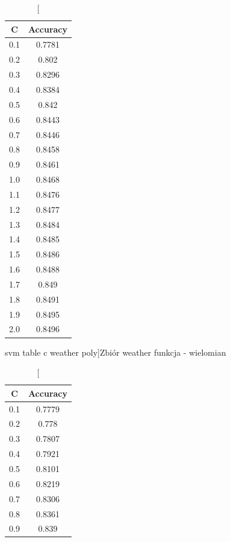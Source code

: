 \documentclass{classrep}
\begin{document}
{{%
\begin{table}[!htbp]
    \begin{minipage}{.35\textwidth}
        \centering
        \begin{tabular}{|c|c|}
            \hline
			C & Accuracy \\ \hline
0.1 & 0.7781 \\ \hline
0.2 & 0.802 \\ \hline
0.3 & 0.8296 \\ \hline
0.4 & 0.8384 \\ \hline
0.5 & 0.842 \\ \hline
0.6 & 0.8443 \\ \hline
0.7 & 0.8446 \\ \hline
0.8 & 0.8458 \\ \hline
0.9 & 0.8461 \\ \hline
1.0 & 0.8468 \\ \hline
1.1 & 0.8476 \\ \hline
1.2 & 0.8477 \\ \hline
1.3 & 0.8484 \\ \hline
1.4 & 0.8485 \\ \hline
1.5 & 0.8486 \\ \hline
1.6 & 0.8488 \\ \hline
1.7 & 0.849 \\ \hline
1.8 & 0.8491 \\ \hline
1.9 & 0.8495 \\ \hline
2.0 & 0.8496 \\ \hline
        \end{tabular}
        \caption
        [svm table c weather poly]{Zbiór weather funkcja - wielomian}
		\label{svm_table_c_weather_poly}
    \end{minipage}
    \hfill
    \begin{minipage}{.3\textwidth}
        \centering
        \begin{tabular}{|c|c|}
            \hline
			C & Accuracy \\ \hline
0.1 & 0.7779 \\ \hline
0.2 & 0.778 \\ \hline
0.3 & 0.7807 \\ \hline
0.4 & 0.7921 \\ \hline
0.5 & 0.8101 \\ \hline
0.6 & 0.8219 \\ \hline
0.7 & 0.8306 \\ \hline
0.8 & 0.8361 \\ \hline
0.9 & 0.839 \\ \hline

\end{tabular}
\end{minipage}
\end{table}}}
\end{document}
